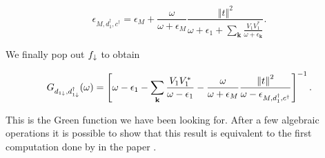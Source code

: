  \begin{equation}
    \epsilon_{M,d_1^\dagger,c^\dagger}= \epsilon_{M}+\frac{\omega}{\omega+\epsilon_{M}}\frac{\left\Vert t\right\Vert ^{2}}{\omega+\epsilon_{1}+\sum_{\mathbf{k}}\frac{V_{1}V_{1}^{*}}{\omega+\epsilon_{\mathbf{k}}}}.
\end{equation}
 
 We finally pop out $f_\downarrow$ to obtain 
 
\begin{equation}
    G_{d_{1\downarrow},d_{1\downarrow}^{\dagger}}(\omega)=\left[\omega-\epsilon_{1}-\sum_{\mathbf{k}}\frac{V_{1}V_{1}^{*}}{\omega-\epsilon_{1}}-\frac{\omega}{\omega+\epsilon_{M}}\frac{\left\Vert t\right\Vert ^{2}}{\omega -\epsilon_{M,d_1^\dagger,c^\dagger}}\right]^{-1}.
\end{equation}

This is the Green function we have been looking for. After a few algebraic operations it is possible to show that this result is equivalent to the first computation done by \citeauthor{liu_detecting_2011}  in the paper \cite{liu_detecting_2011}. 


